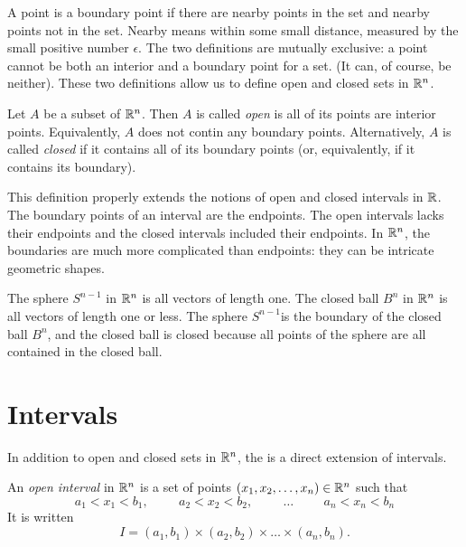 \documentclass[fleqn,letterpaper]{report}
\begin{document}
A point is a boundary point if there are nearby points in the
set and nearby points not in the set.  Nearby means within
some small distance, measured by the small positive number
$\epsilon$.  The two definitions are mutually exclusive: a
point cannot be both an interior and a boundary point for a
set. (It can, of course, be neither). These two definitions
allow us to define open and closed sets in $\mathbb{R}^n$.

\begin{defn}
Let $A$ be a subset of $\mathbb{R}^n$. Then $A$ is called
\emph{open} is all of its points are interior points.
Equivalently, $A$ does not contin any boundary points.
Alternatively, $A$ is called \emph{closed} if it contains
all of its boundary points (or, equivalently, if it contains
its boundary).
\end{defn} 

This definition properly extends the notions of open and
closed intervals in $\mathbb{R}$. The boundary points 
of an interval are the endpoints. The open
intervals lacks their endpoints and the closed intervals
included their endpoints. In $\mathbb{R}^n$, the boundaries are
much more complicated than endpoints: they can be intricate
geometric shapes. 

\begin{example}
The sphere $S^{n-1}$ in $\mathbb{R}^n$ is all vectors of length one.
The closed ball $B^{n}$ in $\mathbb{R}^n$ is all vectors of length
one or less. The sphere $S^{n-1}$is the boundary of the closed
ball $B^n$, and the closed ball is closed because all points
of the sphere are all contained in the closed ball. 
\end{example}

\section{Intervals}
\label{intervals}

In addition to open and closed sets in $\mathbb{R}^n$, the is a
direct extension of intervals.

\begin{defn}
An \emph{open interval} in $\mathbb{R}^n$ is a set of points $(x_1,
x_2, \ldots, x_n) \in \mathbb{R}^n$ such that 
\begin{equation*}
a_1 < x_1 < b_1, \hspace{1cm} 
a_2 < x_2 < b_2, \hspace{1cm} \ldots \hspace{1cm} 
a_n < x_n < b_n 
\end{equation*}
It is written 
\begin{equation*}
I = (a_1,b_1)\times (a_2,b_2) \times \ldots \times (a_n,b_n).
\end{equation*}
\end{defn}
\end{document}
